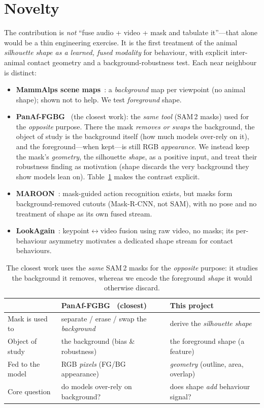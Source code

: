\documentclass[11pt]{article}
\begin{document}
\section{Novelty}
The contribution is \emph{not} ``fuse audio + video + mask and tabulate it''---that alone would be a thin engineering exercise. It is the first treatment of the animal \emph{silhouette shape as a learned, fused modality} for behaviour, with explicit inter-animal contact geometry and a background-robustness test. Each near neighbour is distinct:
\begin{itemize}
  \item \textbf{MammAlps scene maps}~\cite{mammalps}: a \emph{background} map per viewpoint (no animal shape); shown not to help. We test \emph{foreground} shape.
  \item \textbf{PanAf-FGBG}~\cite{panaf} (the closest work): the \emph{same tool} (SAM\,2 masks) used for the \emph{opposite} purpose. There the mask \emph{removes or swaps} the background, the object of study is the background itself (how much models over-rely on it), and the foreground---when kept---is still RGB \emph{appearance}. We instead keep the mask's \emph{geometry}, the silhouette \emph{shape}, as a positive input, and treat their robustness finding as motivation (shape discards the very background they show models lean on). Table~\ref{tab:vspanaf} makes the contrast explicit.
  \item \textbf{MAROON}~\cite{maroon}: mask-guided action recognition exists, but masks form background-removed cutouts (Mask-R-CNN, not SAM), with no pose and no treatment of shape as its own fused stream.
  \item \textbf{LookAgain}~\cite{lookagain}: keypoint$\leftrightarrow$video fusion using raw video, no masks; its per-behaviour asymmetry motivates a dedicated shape stream for contact behaviours.
\end{itemize}

\begin{table}[h]
\centering\small
\begin{tabular}{@{}lll@{}}
\toprule
 & \textbf{PanAf-FGBG}~\cite{panaf} (closest) & \textbf{This project} \\
\midrule
Mask is used to  & separate / erase / swap the \emph{background} & derive the \emph{silhouette shape} \\
Object of study  & the background (bias \& robustness)           & the foreground shape (a feature) \\
Fed to the model & RGB \emph{pixels} (FG/BG appearance)          & \emph{geometry} (outline, area, overlap) \\
Core question    & do models over-rely on background?            & does shape \emph{add} behaviour signal? \\
\bottomrule
\end{tabular}
\caption{The closest work uses the \emph{same} SAM\,2 masks for the \emph{opposite} purpose: it studies the background it removes, whereas we encode the foreground \emph{shape} it would otherwise discard.}
\label{tab:vspanaf}
\end{table}
\end{document}
